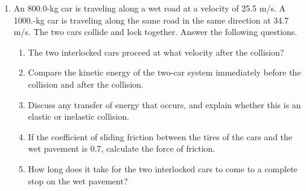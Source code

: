 \documentclass{../../../oss-apphys}
\begin{document}
\begin{enumerate}[leftmargin=15pt]
  
\item An 800.0-kg car is traveling along a wet road at a velocity of
  25.5 m/s. A \num{1000.}-kg car is traveling along the same road in the same
  direction at 34.7 m/s. The two cars collide and lock together. Answer the
  following questions.
  \begin{enumerate}[leftmargin=18pt]
  \item The two interlocked cars proceed at what velocity after the collision?
  \item Compare the kinetic energy of the two-car system immediately before
    the collision and after the collision.
  \item Discuss any transfer of energy that occurs, and explain whether this is
    an elastic or inelastic collision.
  \item If the coefficient of sliding friction between the tires of the cars
    and the wet pavement is 0.7, calculate the force of friction.
  \item  How long does it take for the two interlocked cars to come to a
    complete stop on the wet pavement?
  \end{enumerate}
  \newpage
  

\end{enumerate}
\end{document}
